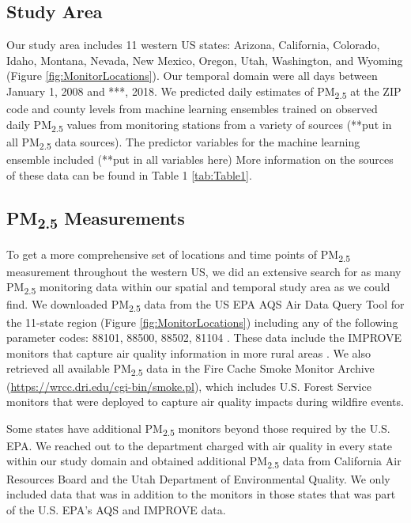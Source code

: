 \documentclass[english]{article}
\begin{document}
\subsection*{Study Area}

Our study area includes 11 western US states: Arizona, California, Colorado, Idaho, Montana, Nevada, New Mexico, Oregon, Utah, Washington, and Wyoming (Figure \ref{fig:MonitorLocations}). Our temporal domain were all days between January 1, 2008 and ***, 2018. We predicted daily estimates of PM\textsubscript{2.5} at the ZIP code and county levels from machine learning ensembles trained on observed daily PM\textsubscript{2.5} values from monitoring stations from a variety of sources (**put in all PM\textsubscript{2.5} data sources). The predictor variables for the machine learning ensemble included (**put in all variables here) %
More information on the sources of these data can be found in Table 1 \ref{tab:Table1}.  


\subsection*{PM\textsubscript{2.5} Measurements}
To get a more comprehensive set of locations and time points of PM\textsubscript{2.5} measurement throughout the western US, we did an extensive search for as many PM\textsubscript{2.5} monitoring data within our spatial and temporal study area as we could find. We downloaded PM\textsubscript{2.5} data from the US EPA AQS Air Data Query Tool \cite{EPAAirData2017}  for the 11-state region (Figure \ref{fig:MonitorLocations}) including any of the following parameter codes: 88101, 88500, 88502, 81104 \cite{EPANPM25Memo2017,EPANPM25Parameters2017,EPANAllParameters2017}. These data include the IMPROVE monitors that capture air quality information in more rural areas \cite{EPANPM25IMPROVE2017}. We also retrieved all available PM\textsubscript{2.5} data in the Fire Cache Smoke Monitor Archive (\url{https://wrcc.dri.edu/cgi-bin/smoke.pl}), which includes U.S. Forest Service monitors that were deployed to capture air quality impacts during wildfire events. 

Some states have additional PM\textsubscript{2.5} monitors beyond those required by the U.S. EPA. We reached out to the department charged with air quality in every state within our study domain and obtained additional PM\textsubscript{2.5} data from California Air Resources Board and the Utah Department of Environmental Quality. We only included data that was in addition to the monitors in those states that was part of the U.S. EPA's AQS and IMPROVE data.   
\end{document}
